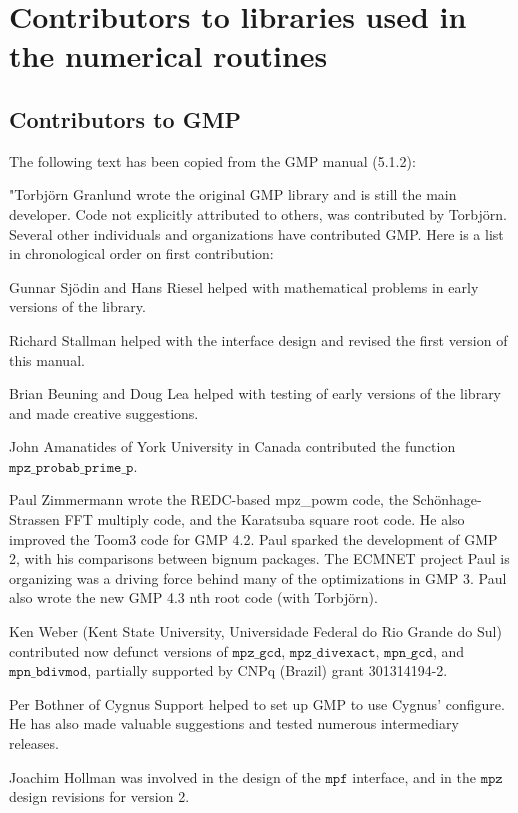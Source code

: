 \section{Contributors to libraries used in the numerical routines}

\subsection{Contributors to GMP}
\label{Contributors to GMP}
The following text has been copied from the GMP manual (5.1.2):

\vpara
"Torbj\"orn Granlund wrote the original GMP library and is still the main
developer.  Code not explicitly attributed to others, was contributed by
Torbj\"orn.  Several other individuals and organizations have contributed
GMP.  Here is a list in chronological order on first contribution:

\vpara
Gunnar Sj\"odin and Hans Riesel helped with mathematical problems in early
versions of the library.

\vpara
Richard Stallman helped with the interface design and revised the first
version of this manual.

\vpara
Brian Beuning and Doug Lea helped with testing of early versions of the
library and made creative suggestions.

\vpara
John Amanatides of York University in Canada contributed the function
$\mathtt{mpz\_probab\_prime\_p}$.

\vpara
Paul Zimmermann wrote the REDC-based mpz\_powm code, the Sch\"onhage-Strassen
FFT multiply code, and the Karatsuba square root code.  He also improved the
Toom3 code for GMP 4.2.  Paul sparked the development of GMP 2, with his
comparisons between bignum packages.  The ECMNET project Paul is organizing
was a driving force behind many of the optimizations in GMP 3.  Paul also
wrote the new GMP 4.3 nth root code (with Torbj\"orn).

\vpara
Ken Weber (Kent State University, Universidade Federal do Rio Grande do Sul)
contributed now defunct versions of $\mathtt{mpz\_gcd}$, $\mathtt{mpz\_divexact}$,
$\mathtt{mpn\_gcd}$, and $\mathtt{mpn\_bdivmod}$, partially supported by CNPq (Brazil)
grant 301314194-2.

\vpara
Per Bothner of Cygnus Support helped to set up GMP to use Cygnus' configure.
He has also made valuable suggestions and tested numerous intermediary
releases.

\vpara
Joachim Hollman was involved in the design of the $\mathtt{mpf}$ interface, and in
the $\mathtt{mpz}$ design revisions for version 2.

